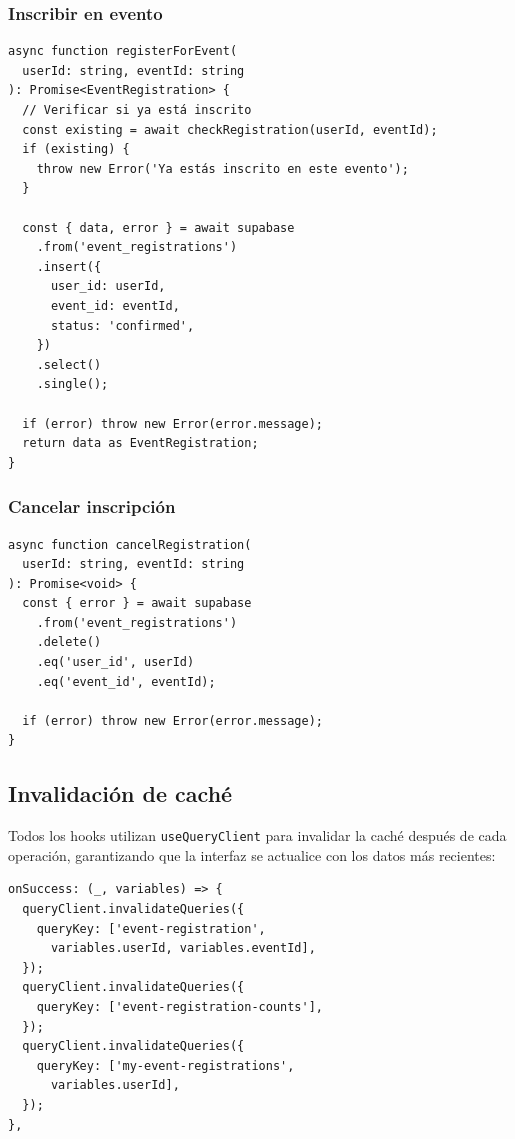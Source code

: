 \subsubsection*{Inscribir en evento}

\begin{verbatim}
async function registerForEvent(
  userId: string, eventId: string
): Promise<EventRegistration> {
  // Verificar si ya está inscrito
  const existing = await checkRegistration(userId, eventId);
  if (existing) {
    throw new Error('Ya estás inscrito en este evento');
  }

  const { data, error } = await supabase
    .from('event_registrations')
    .insert({
      user_id: userId,
      event_id: eventId,
      status: 'confirmed',
    })
    .select()
    .single();

  if (error) throw new Error(error.message);
  return data as EventRegistration;
}
\end{verbatim}

\subsubsection*{Cancelar inscripci\'on}

\begin{verbatim}
async function cancelRegistration(
  userId: string, eventId: string
): Promise<void> {
  const { error } = await supabase
    .from('event_registrations')
    .delete()
    .eq('user_id', userId)
    .eq('event_id', eventId);

  if (error) throw new Error(error.message);
}
\end{verbatim}

\subsection{Invalidaci\'on de cach\'e}

Todos los hooks utilizan \texttt{useQueryClient} para invalidar la
cach\'e despu\'es de cada operaci\'on, garantizando que la interfaz
se actualice con los datos m\'as recientes:

\begin{verbatim}
onSuccess: (_, variables) => {
  queryClient.invalidateQueries({
    queryKey: ['event-registration',
      variables.userId, variables.eventId],
  });
  queryClient.invalidateQueries({
    queryKey: ['event-registration-counts'],
  });
  queryClient.invalidateQueries({
    queryKey: ['my-event-registrations',
      variables.userId],
  });
},
\end{verbatim}
